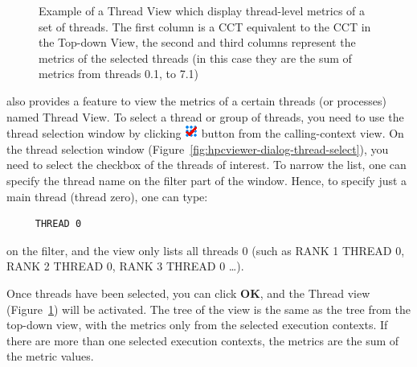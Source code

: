 \begin{figure}[t]
\caption{Example of a Thread View which display thread-level metrics of a set of threads. The first column is a CCT equivalent to the CCT in the Top-down View, the second and third columns represent the metrics of the selected threads (in this case they are the sum of metrics from threads 0.1, to 7.1)}
\label{fig:hpcviewer-view-thread-level}
\end{figure}

\hpcviewer{} also provides a feature to view the metrics of a certain threads (or processes) named Thread View.
To select a thread or group of threads, you need to use the thread selection window by clicking \includegraphics[scale=.6]{fig/hpcviewer-thread.png} button from the calling-context view.
On the thread selection window (Figure~\ref{fig:hpcviewer-dialog-thread-select}), you need to select the checkbox of the threads of interest.
To  narrow the list, one can specify the thread name on the filter part of the window.
Hence, to specify just a main thread (thread zero), one can type:
\begin{verbatim}
     THREAD 0     
\end{verbatim}
on the filter, and the view only lists all threads 0 (such as RANK 1 THREAD 0, RANK 2 THREAD 0, RANK 3 THREAD 0 \dots).

Once threads have been selected, you can click \textbf{OK}, and the Thread view (Figure~\ref{fig:hpcviewer-view-thread-level}) will be activated.
The tree of the view is the same as the tree from the top-down view, with the metrics only from the selected execution contexts.
If there are more than one selected execution contexts, the metrics are the sum of the metric values.


